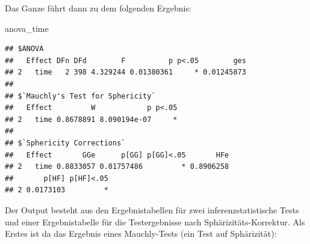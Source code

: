 \documentclass[
]{book}
\newenvironment{Shaded}{\begin{snugshade}}{\end{snugshade}}
\newcommand{\AttributeTok}[1]{\textcolor[rgb]{0.77,0.63,0.00}{#1}}
\newcommand{\NormalTok}[1]{#1}
\newcommand{\SpecialCharTok}[1]{\textcolor[rgb]{0.00,0.00,0.00}{#1}}
\newcommand{\StringTok}[1]{\textcolor[rgb]{0.31,0.60,0.02}{#1}}
\begin{document}
Das Ganze führt dann zu dem folgenden Ergebnis:

\begin{Shaded}
\begin{Highlighting}[]
\NormalTok{anova\_time}
\end{Highlighting}
\end{Shaded}

\begin{verbatim}
## $ANOVA
##   Effect DFn DFd        F          p p<.05        ges
## 2   time   2 398 4.329244 0.01380361     * 0.01245873
## 
## $`Mauchly's Test for Sphericity`
##   Effect         W            p p<.05
## 2   time 0.8678891 8.090194e-07     *
## 
## $`Sphericity Corrections`
##   Effect       GGe      p[GG] p[GG]<.05       HFe
## 2   time 0.8833057 0.01757486         * 0.8906258
##       p[HF] p[HF]<.05
## 2 0.0173103         *
\end{verbatim}

Der Output besteht aus den Ergebnistabellen für zwei inferenzstatistische Tests und einer Ergebnistabelle für die Testergebnisse nach Sphärizitäts-Korrektur.
Als Erstes ist da das Ergebnis eines Mauchly-Tests (ein Test auf Sphärizität):

\begin{Shaded}
\end{Shaded}

 
  \providecommand{\huxb}[2]{\arrayrulecolor[RGB]{#1}\global\arrayrulewidth=#2pt}
  \providecommand{\huxvb}[2]{\color[RGB]{#1}\vrule width #2pt}
  \providecommand{\huxtpad}[1]{\rule{0pt}{#1}}
  \providecommand{\huxbpad}[1]{\rule[-#1]{0pt}{#1}}
\end{document}
